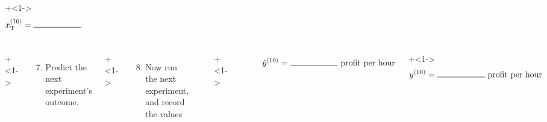 \documentclass[handout,11pt,aspectratio=169,mathserif]{beamer}
\begin{document}
\begin{frame}
\begin{columns}[T]
			\vspace{-1.3cm}
			\onslide+<1->{	
				\begin{align*} 
					x_\text{T}^{(10)} &= \rule{2cm}{.5pt}
				\end{align*}
			}
	\end{columns}
	
	\vspace{-0.3cm}
	\begin{columns}[T]

			\vspace{0cm}
			\onslide+<1->{
				{\tiny 
					\begin{enumerate}\setcounter{enumi}{6}
						\item	Predict the next experiment's outcome.
					\end{enumerate}
				
				\par}
			}
			
			\vspace{0cm}
			\onslide+<1->{
				{\tiny 
					\begin{enumerate}\setcounter{enumi}{7}
						\item	Now run the next experiment, and record the values
					\end{enumerate}
				
				\par}
			}
			
			\rule[3mm]{0.01cm}{85mm}%
			
			
			\onslide+<1->{	
				\hrule
				
				\begin{align*}
					~~~\hat{y}^{(10)}  = \rule{2cm}{.5pt} ~\text{profit per hour} 
				\end{align*}
			}
			
			\vspace{-1.15cm}
			\onslide+<1->{	
				\begin{align*}
					y^{(10)} &=  \rule{2cm}{.5pt} ~\text{profit per hour}
				\end{align*}
			}
	\end{columns}
	
\end{frame}
\end{document}
